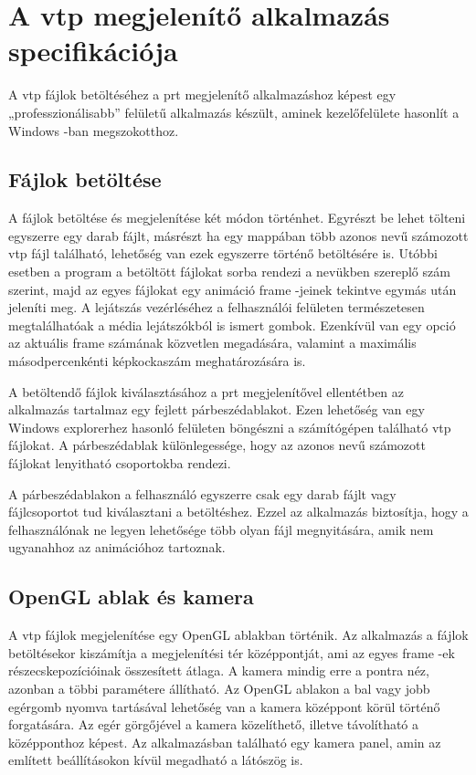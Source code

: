 \section{A vtp megjelenítő alkalmazás specifikációja}

A vtp fájlok betöltéséhez a prt megjelenítő alkalmazáshoz képest 
egy „professzionálisabb” felületű alkalmazás készült, 
aminek kezelőfelülete hasonlít a Windows -ban megszokotthoz.

\subsection{Fájlok betöltése}

A fájlok betöltése és megjelenítése két módon történhet. 
Egyrészt be lehet tölteni egyszerre egy darab fájlt, 
másrészt ha egy mappában több azonos nevű számozott vtp fájl található, 
lehetőség van ezek egyszerre történő betöltésére is. 
Utóbbi esetben a program a betöltött fájlokat sorba rendezi 
a nevükben szereplő szám szerint, 
majd az egyes fájlokat egy animáció frame -jeinek tekintve 
egymás után jeleníti meg. 
A lejátszás vezérléséhez a felhasználói felületen természetesen megtalálhatóak 
a média lejátszókból is ismert gombok.
Ezenkívül van egy opció az aktuális frame számának közvetlen megadására, 
valamint a maximális másodpercenkénti képkockaszám meghatározására is.

A betöltendő fájlok kiválasztásához a prt megjelenítővel ellentétben 
az alkalmazás tartalmaz egy fejlett párbeszédablakot. 
Ezen lehetőség van egy Windows explorerhez hasonló felületen böngészni 
a számítógépen található vtp fájlokat. 
A párbeszédablak különlegessége, 
hogy az azonos nevű számozott fájlokat lenyitható csoportokba rendezi.

A párbeszédablakon a felhasználó egyszerre csak egy darab fájlt 
vagy fájlcsoportot tud kiválasztani a betöltéshez. 
Ezzel az alkalmazás biztosítja, 
hogy a felhasználónak ne legyen lehetősége több olyan fájl megnyitására, 
amik nem ugyanahhoz az animációhoz tartoznak.

\subsection{OpenGL ablak és kamera}

A vtp fájlok megjelenítése egy OpenGL ablakban történik. 
Az alkalmazás a fájlok betöltésekor kiszámítja a megjelenítési tér középpontját, 
ami az egyes frame -ek részecskepozícióinak összesített átlaga. 
A kamera mindig erre a pontra néz, 
azonban a többi paramétere állítható. 
Az OpenGL ablakon a bal vagy jobb egérgomb nyomva tartásával 
lehetőség van a kamera középpont körül történő forgatására. 
Az egér görgőjével a kamera közelíthető, 
illetve távolítható a középponthoz képest. 
Az alkalmazásban található egy kamera panel, 
amin az említett beállításokon kívül megadható a látószög is.

